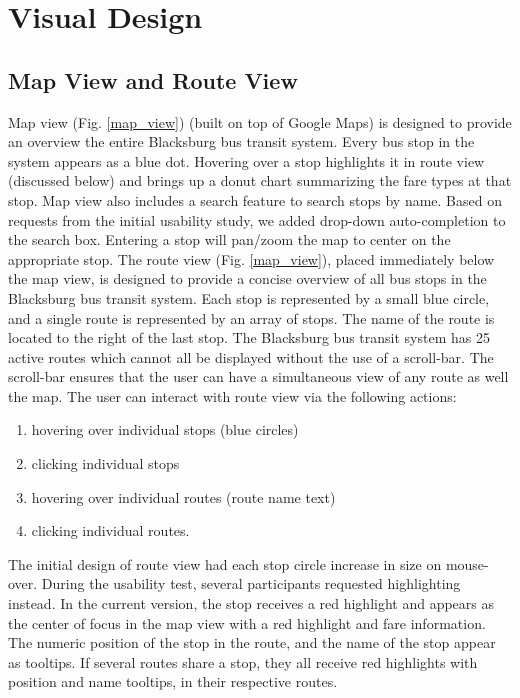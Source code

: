 \documentclass[journal]{vgtc}
\begin{document}
\section{Visual Design}
\subsection{Map View and Route View}

Map view (Fig. \ref{map_view}) (built on top of Google Maps) is designed to provide an overview the entire Blacksburg bus transit system. Every bus stop in the system appears as a blue dot. Hovering over a stop highlights it in route view (discussed below) and brings up a donut chart summarizing the fare types at that stop. Map view also includes a search feature to search stops by name. Based on requests from the initial usability study, we added drop-down auto-completion to the search box. Entering a stop will pan/zoom the map to center on the appropriate stop. The route view (Fig. \ref{map_view}), placed immediately below the map view, is designed to provide a concise overview of all bus stops in the Blacksburg bus transit system. Each stop is represented by a small blue circle, and a single route is represented by an array of stops. The name of the route is located to the right of the last stop. The Blacksburg bus transit system has 25 active routes which cannot all be displayed without the use of a scroll-bar. The scroll-bar ensures that the user can have a simultaneous view of any route as well the map. The user can interact with route view via the following actions:
\begin{enumerate}
  \item hovering over individual stops (blue circles)
  \item clicking individual stops 
  \item hovering over individual routes (route name text)
  \item clicking individual routes.
\end{enumerate}

The initial design of route view had each stop circle increase in size on mouse-over. During the usability test, several participants requested highlighting instead. In the current version, the stop receives a red highlight and appears as the center of focus in the map view with a red highlight and fare information. The numeric position of the stop in the route, and the name of the stop appear as tooltips. If several routes share a stop, they all receive red highlights with position and name tooltips, in their respective routes. 
\end{document}
